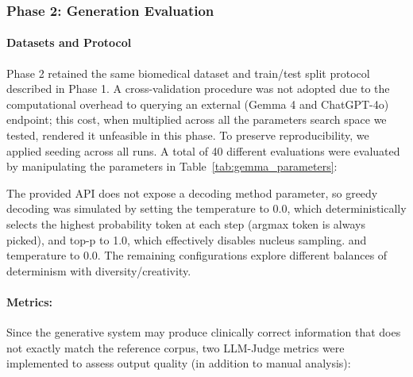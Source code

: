 \subsubsection{Phase 2: Generation Evaluation}
\paragraph{Datasets and Protocol}
Phase 2 retained the same biomedical dataset and train/test split protocol described in Phase 1. A cross-validation procedure was not adopted due to the computational overhead to querying an external (Gemma 4 and ChatGPT-4o) endpoint; this cost, when multiplied across all the parameters search space we tested, rendered it unfeasible in this phase. To preserve reproducibility, we applied seeding across all runs.
A total of 40 different evaluations were evaluated by manipulating the parameters in Table~\ref{tab:gemma_parameters}:

The provided API does not expose a decoding method parameter, so greedy decoding was simulated by setting the temperature to 0.0, which deterministically selects the highest probability token at each step (argmax token is always picked), and top-p to 1.0, which effectively disables nucleus sampling. and temperature to 0.0. The remaining configurations explore different balances of determinism with diversity/creativity.

\paragraph{Metrics:}
Since the generative system may produce clinically correct information that does not exactly match the reference corpus, two LLM-Judge metrics were implemented to assess output quality (in addition to manual analysis):

